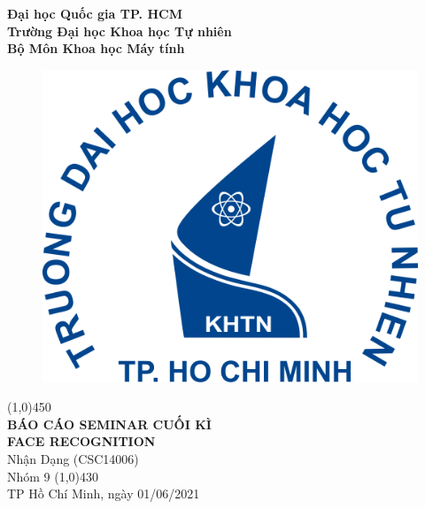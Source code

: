 \documentclass[a4paper, 12pt]{article}
\begin{document}
\begin{titlepage}
    \begin{center}
        \Large\textbf{Đại học Quốc gia TP. HCM\\Trường Đại học Khoa học Tự nhiên\\Bộ Môn Khoa học Máy tính}\\

        \vspace*{1cm}
        \begin{figure}[H]
            \begin{center}
                \includegraphics[scale=0.2]{img/hcmus-logo}
            \end{center}
        \end{figure}
        \line(1,0){450}\\[4mm]
        \LARGE\textbf{\MakeUppercase{Báo cáo Seminar Cuối kì\\ Face Recognition}}\\[3mm]
        \Large{Nhận Dạng (CSC14006)}\\[3mm]
        \Large{Nhóm 9}
        \line(1,0){430}\\

        \vfill
        TP Hồ Chí Minh, ngày 01/06/2021
    \end{center}
\end{titlepage}

\tableofcontents
\thispagestyle{empty}
\clearpage
\end{document}
